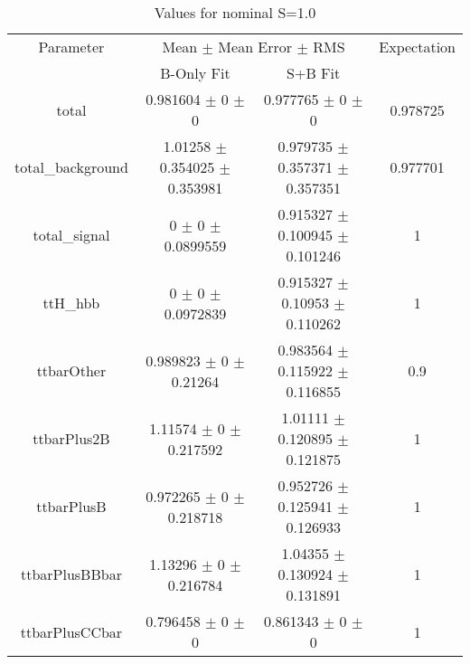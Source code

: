 \begin{table}
\centering
\caption{Values for nominal S=1.0}
\begin{tabular}{cccc}
\toprule
Parameter & \multicolumn{2}{c}{Mean $\pm$ Mean Error $\pm$ RMS} & Expectation\\
 & B-Only Fit & S+B Fit & \\
\midrule
total & \num{0.981604} $\pm$ \num{0} $\pm$ \num{0} & \num{0.977765} $\pm$ \num{0} $\pm$ \num{0} & \num{0.978725}\\
total\_background & \num{1.01258} $\pm$ \num{0.354025} $\pm$ \num{0.353981} & \num{0.979735} $\pm$ \num{0.357371} $\pm$ \num{0.357351} & \num{0.977701}\\
total\_signal & \num{0} $\pm$ \num{0} $\pm$ \num{0.0899559} & \num{0.915327} $\pm$ \num{0.100945} $\pm$ \num{0.101246} & \num{1}\\
ttH\_hbb & \num{0} $\pm$ \num{0} $\pm$ \num{0.0972839} & \num{0.915327} $\pm$ \num{0.10953} $\pm$ \num{0.110262} & \num{1}\\
ttbarOther & \num{0.989823} $\pm$ \num{0} $\pm$ \num{0.21264} & \num{0.983564} $\pm$ \num{0.115922} $\pm$ \num{0.116855} & \num{0.9}\\
ttbarPlus2B & \num{1.11574} $\pm$ \num{0} $\pm$ \num{0.217592} & \num{1.01111} $\pm$ \num{0.120895} $\pm$ \num{0.121875} & \num{1}\\
ttbarPlusB & \num{0.972265} $\pm$ \num{0} $\pm$ \num{0.218718} & \num{0.952726} $\pm$ \num{0.125941} $\pm$ \num{0.126933} & \num{1}\\
ttbarPlusBBbar & \num{1.13296} $\pm$ \num{0} $\pm$ \num{0.216784} & \num{1.04355} $\pm$ \num{0.130924} $\pm$ \num{0.131891} & \num{1}\\
ttbarPlusCCbar & \num{0.796458} $\pm$ \num{0} $\pm$ \num{0} & \num{0.861343} $\pm$ \num{0} $\pm$ \num{0} & \num{1}\\
\bottomrule
\end{tabular}
\end{table}